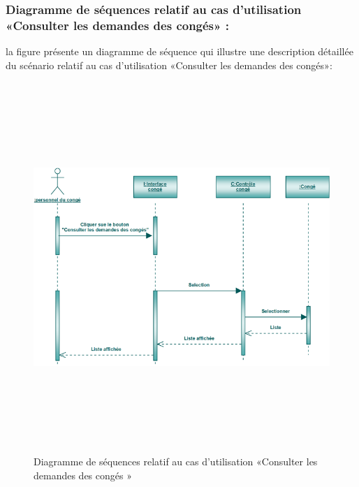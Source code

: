 \documentclass[12 pt ]{report}
\begin{document}
\subsubsection{Diagramme de séquences relatif au cas d’utilisation «Consulter les demandes des congés» :}
la figure   présente un diagramme de séquence qui illustre une description détaillée du scénario relatif au cas d’utilisation «Consulter les demandes des congés»: 
\begin{figure}[h]
 \begin{center}
\includegraphics[width= 15 cm ,height=  14cm]{sec_dem_con.PNG}
\caption{Diagramme de séquences relatif au cas d’utilisation «Consulter les demandes des congés »}

\end{center}
\end{figure}
\newpage
\end{document}

